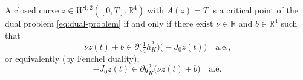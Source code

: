 \begin{lemma}\label{lem:dual-euler-lagrange}
A closed curve $z \in W^{1,2}([0,T], \mathbb{R}^4)$ with $A(z) = T$ is a
critical point of the dual problem \eqref{eq:dual-problem} if and only if
there exist $\nu \in \mathbb{R}$ and $b \in \mathbb{R}^4$ such that
\begin{equation}\label{eq:dual-euler-lagrange}
  \nu z(t) + b \in \partial\bigl(\tfrac{1}{4} h_K^2\bigr)\bigl(-J_0\dot{z}(t)\bigr)
  \quad \text{a.e.,}
\end{equation}
or equivalently (by Fenchel duality),
\begin{equation}\label{eq:dual-euler-lagrange-primal}
  -J_0\dot{z}(t) \in \partial g_K^2\bigl(\nu z(t) + b\bigr)
  \quad \text{a.e.}
\end{equation}
\end{lemma}

